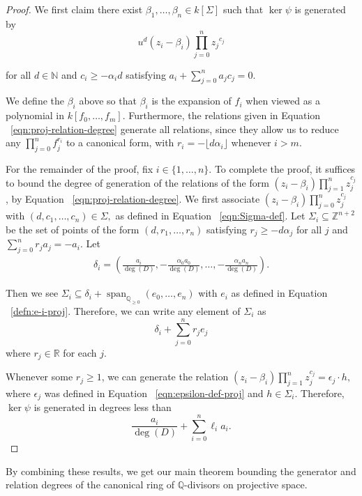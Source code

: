 \documentclass{amsart}
\theoremstyle{plain}
\theoremstyle{definition}
\theoremstyle{remark}
\numberwithin{equation}{section}
\newcommand\bq{{\mathbb Q}}
\newcommand\bz{{\mathbb Z}}
\newcommand\bida{a}
\DeclareMathOperator{\newspan}{span}
\begin{document}
\begin{proof}
We first claim there exist $\beta_1, \ldots, \beta_n \in k[\Sigma]$
such that $\ker \psi$ is generated by
\begin{equation}
\label{eqn:relations-psi-proj}
	u^d(z_i - \beta_i)\prod_{j=0}^n {z_j}^{c_{j}}
\end{equation}

\noindent
for all $d \in \mathbb{N}$ and $c_i \ge -\alpha_i d$ satisfying
$\bida_i + \sum_{j = 0}^n \bida_j c_j = 0$.

We define the $\beta_i$ above so that $\beta_i$ is the expansion of
$f_i$ when viewed as a polynomial in $k[f_0,\ldots, f_{m}]$.
Furthermore, the relations given in Equation
~\eqref{eqn:proj-relation-degree} generate all relations, since they
allow us to reduce any $ \prod_{j = 0}^n f_j^{r_i}$ to a canonical
form, with $r_i = -\lfloor  d \alpha_i\rfloor$ whenever $i  > m$.

For the remainder of the proof, fix $i \in \{1,\ldots, n\}$. To
complete the proof, it suffices to bound the degree of generation
of the relations of the form $(z_i - \beta_i) \prod_{j = 1}^n
z_j^{c_j}$, by Equation ~\eqref{eqn:proj-relation-degree}. We first
associate $(z_i - \beta_i)\prod_{j=0}^n z_j^{c_j}$ with $(d, c_1,
\ldots, c_n) \in \Sigma,$ as defined in Equation
~\eqref{eqn:Sigma-def}. Let $\Sigma_i \subseteq \bz^{n + 2}$
be the set of points of the form $(d, r_1, \ldots, r_n)$ satisfying
$r_j \ge -d \alpha_j$ for all $j$ and $\sum_{j=0}^n r_j a_j = -a_i$.
Let
\begin{align*}
	\delta_i = \left(\frac{a_i}{\deg(D)}, -\frac{\alpha_0 a_0}{\deg(D)},
	\ldots, - \frac{\alpha_n a_n}{\deg(D)} \right).
\end{align*}

\noindent
Then we see $\Sigma_i \subseteq \delta_i + \newspan_{\bq_{\geq 0}}
(e_0, \ldots, e_n)$ with $e_i$ as defined in Equation
~\ref{defn:e-i-proj}. Therefore, we can write any element of
$\Sigma_i$ as
\[
	\delta_i + \sum_{j=0}^n r_j e_j
\]
where $r_j \in \mathbb{R}$ for each $j$.

Whenever some $r_j \ge 1$, we can generate the relation $(z_i -
\beta_i)\prod_{j=1}^n z_j^{c_j} = \epsilon_j \cdot h,$ where
$\epsilon_j$ was defined in Equation ~\ref{eqn:epsilon-def-proj} and
$h \in \Sigma_i$. Therefore, $\ker \psi$ is generated in degrees
less than
\[
	\frac{\bida_i}{\deg(D)} + \sum_{i=0}^n \ell_i a_i.
\]
\end{proof}

By combining these results, we get our main theorem bounding
the generator and relation degrees of the canonical ring of
$\bq$-divisors on projective space.
\end{document}
